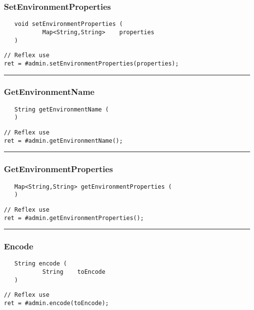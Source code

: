 \subsubsection{SetEnvironmentProperties}
\label{Api:SetEnvironmentProperties}
\begin{verbatim}
   void setEnvironmentProperties (
           Map<String,String>    properties
   )
\end{verbatim}
\begin{lstlisting}[language=reflex]
// Reflex use
ret = #admin.setEnvironmentProperties(properties);
\end{lstlisting}



\rule{15cm}{2pt}
\subsubsection{GetEnvironmentName}
\label{Api:GetEnvironmentName}
\begin{verbatim}
   String getEnvironmentName (
   )
\end{verbatim}
\begin{lstlisting}[language=reflex]
// Reflex use
ret = #admin.getEnvironmentName();
\end{lstlisting}



\rule{15cm}{2pt}
\subsubsection{GetEnvironmentProperties}
\label{Api:GetEnvironmentProperties}
\begin{verbatim}
   Map<String,String> getEnvironmentProperties (
   )
\end{verbatim}
\begin{lstlisting}[language=reflex]
// Reflex use
ret = #admin.getEnvironmentProperties();
\end{lstlisting}



\rule{15cm}{2pt}
\subsubsection{Encode}
\label{Api:Encode}
\begin{verbatim}
   String encode (
           String    toEncode
   )
\end{verbatim}
\begin{lstlisting}[language=reflex]
// Reflex use
ret = #admin.encode(toEncode);
\end{lstlisting}



